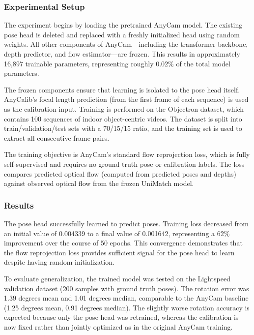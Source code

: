 \subsubsection{Experimental Setup}

The experiment begins by loading the pretrained AnyCam model. The existing pose head is deleted and replaced with a freshly initialized head using random weights. All other components of AnyCam---including the transformer backbone, depth predictor, and flow estimator---are frozen. This results in approximately 16,897 trainable parameters, representing roughly 0.02\% of the total model parameters.

The frozen components ensure that learning is isolated to the pose head itself. AnyCalib's focal length prediction (from the first frame of each sequence) is used as the calibration input. Training is performed on the Objectron dataset, which contains 100 sequences of indoor object-centric videos. The dataset is split into train/validation/test sets with a 70/15/15 ratio, and the training set is used to extract all consecutive frame pairs.

The training objective is AnyCam's standard flow reprojection loss, which is fully self-supervised and requires no ground truth pose or calibration labels. The loss compares predicted optical flow (computed from predicted poses and depths) against observed optical flow from the frozen UniMatch model.

\subsubsection{Results}

The pose head successfully learned to predict poses. Training loss decreased from an initial value of 0.004339 to a final value of 0.001642, representing a 62\% improvement over the course of 50 epochs. This convergence demonstrates that the flow reprojection loss provides sufficient signal for the pose head to learn despite having random initialization.

To evaluate generalization, the trained model was tested on the Lightspeed validation dataset (200 samples with ground truth poses). The rotation error was 1.39 degrees mean and 1.01 degrees median, comparable to the AnyCam baseline (1.25 degrees mean, 0.91 degrees median). The slightly worse rotation accuracy is expected because only the pose head was retrained, whereas the calibration is now fixed rather than jointly optimized as in the original AnyCam training.

